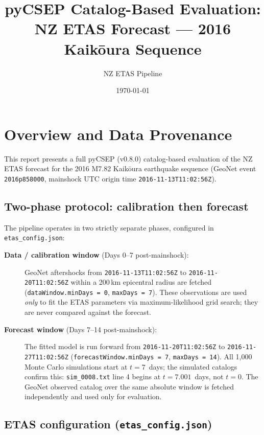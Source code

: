 \documentclass[12pt,a4paper]{article}
\title{pyCSEP Catalog-Based Evaluation:\\
       NZ ETAS Forecast --- 2016 Kaik\={o}ura Sequence}
\author{NZ ETAS Pipeline}
\date{\today}
\begin{document}
\maketitle
\tableofcontents
\newpage

\section{Overview and Data Provenance}

This report presents a full pyCSEP (v0.8.0) catalog-based evaluation of the
NZ ETAS forecast for the 2016 M7.82 Kaik\={o}ura earthquake sequence
(GeoNet event \texttt{2016p858000}, mainshock UTC origin time
\texttt{2016-11-13T11:02:56Z}).

\subsection{Two-phase protocol: calibration then forecast}

The pipeline operates in two strictly separate phases, configured in
\texttt{etas\_config.json}:

\begin{description}
    \item[\textbf{Data / calibration window} (Days 0--7 post-mainshock):]
        GeoNet aftershocks from
        \texttt{2016-11-13T11:02:56Z} to \texttt{2016-11-20T11:02:56Z}
        within a 200\,km epicentral radius are fetched
        (\texttt{dataWindow.minDays = 0}, \texttt{maxDays = 7}).
        These observations are used \emph{only} to fit the ETAS
        parameters via maximum-likelihood grid search;
        they are never compared against the forecast.

    \item[\textbf{Forecast window} (Days 7--14 post-mainshock):]
        The fitted model is run forward from
        \texttt{2016-11-20T11:02:56Z} to \texttt{2016-11-27T11:02:56Z}
        (\texttt{forecastWindow.minDays = 7}, \texttt{maxDays = 14}).
        All 1{,}000 Monte Carlo simulations start at $t = 7$~days; the
        simulated catalogs confirm this: \texttt{sim\_0008.txt} line 4
        begins at $t = 7.001$~days, not $t = 0$.
        The GeoNet observed catalog over the same absolute window is
        fetched independently and used only for evaluation.
\end{description}

\subsection{ETAS configuration (\texttt{etas\_config.json})}
\end{document}
